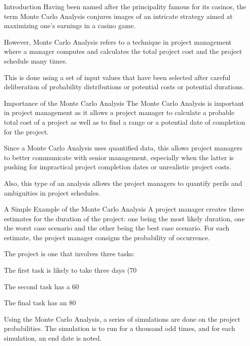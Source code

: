 
Introduction
Having been named after the principality famous for its casinos, the term Monte Carlo Analysis conjures images of an intricate strategy aimed at maximizing one's earnings in a casino game.

However, Monte Carlo Analysis refers to a technique in project management where a manager computes and calculates the total project cost and the project schedule many times.

This is done using a set of input values that have been selected after careful deliberation of probability distributions or potential costs or potential durations.

Importance of the Monte Carlo Analysis
The Monte Carlo Analysis is important in project management as it allows a project manager to calculate a probable total cost of a project as well as to find a range or a potential date of completion for the project.

Since a Monte Carlo Analysis uses quantified data, this allows project managers to better communicate with senior management, especially when the latter is pushing for impractical project completion dates or unrealistic project costs.

Also, this type of an analysis allows the project managers to quantify perils and ambiguities in project schedules.

A Simple Example of the Monte Carlo Analysis
A project manager creates three estimates for the duration of the project: one being the most likely duration, one the worst case scenario and the other being the best case scenario. For each estimate, the project manager consigns the probability of occurrence.

The project is one that involves three tasks:

The first task is likely to take three days (70%

The second task has a 60%

The final task has an 80%

Using the Monte Carlo Analysis, a series of simulations are done on the project probabilities. The simulation is to run for a thousand odd times, and for each simulation, an end date is noted.


